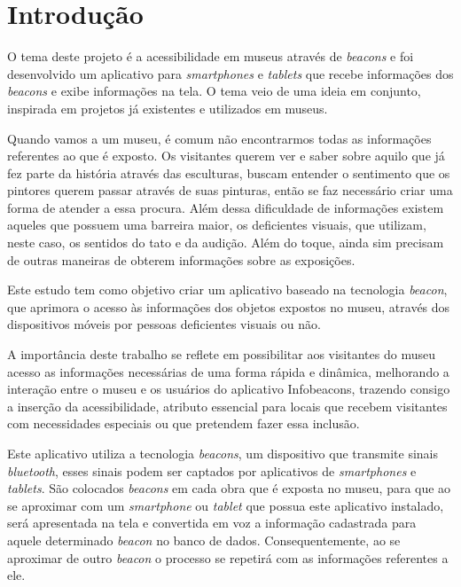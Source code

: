   \chapter{Introdução}
 
O tema deste projeto é a acessibilidade em museus através de \textit{beacons} e foi desenvolvido um aplicativo para \textit{smartphones} e \textit{tablets} que recebe informações dos \textit{beacons} e exibe informações na tela. O tema veio de uma ideia em conjunto, inspirada em projetos já existentes e utilizados em museus.

Quando vamos a um museu, é comum não encontrarmos todas as informações referentes ao que é exposto. Os visitantes querem ver e saber sobre aquilo que já fez parte da história através das esculturas, buscam entender o sentimento que os pintores querem passar através de suas pinturas, então se faz necessário criar uma forma de atender a essa procura. Além dessa dificuldade de informações existem aqueles que possuem uma barreira maior, os deficientes visuais, que utilizam, neste caso, os sentidos do tato e da audição. Além do toque, ainda sim precisam de outras maneiras de obterem informações sobre as exposições. 

Este estudo tem como objetivo criar um aplicativo baseado na tecnologia \textit{beacon}, que aprimora o acesso às informações dos objetos expostos no museu, através dos dispositivos móveis por pessoas deficientes visuais ou não. 

A importância deste trabalho se reflete em possibilitar aos visitantes do museu acesso as informações necessárias de uma forma rápida e dinâmica, melhorando a interação entre o museu e os usuários do aplicativo Infobeacons, trazendo consigo a inserção da acessibilidade, atributo essencial para locais que recebem visitantes com necessidades especiais ou que pretendem fazer essa inclusão.

Este aplicativo utiliza a tecnologia \textit{beacons}, um dispositivo que transmite sinais \textit{bluetooth}, esses sinais podem ser captados por aplicativos de \textit{smartphones} e \textit{tablets}. São colocados \textit{beacons} em cada obra que é exposta no museu, para que ao se aproximar com um \textit{smartphone} ou \textit{tablet} que possua este aplicativo instalado, será apresentada na tela e convertida em voz a informação cadastrada para aquele determinado \textit{beacon} no banco de dados. Consequentemente, ao se aproximar de outro \textit{beacon} o processo se repetirá com as informações referentes a ele. 
